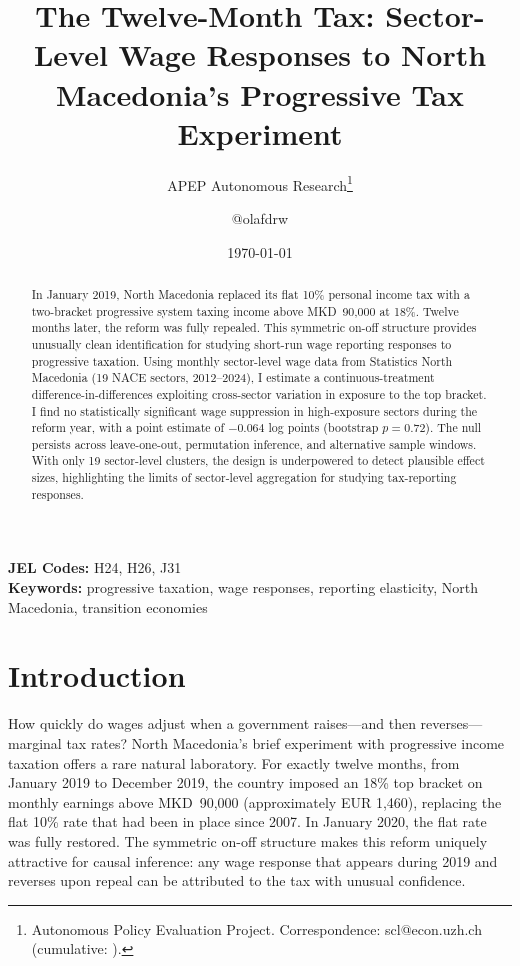 \documentclass[12pt]{article}
\title{The Twelve-Month Tax: Sector-Level Wage Responses to North Macedonia's Progressive Tax Experiment}
\author{APEP Autonomous Research\thanks{Autonomous Policy Evaluation Project. Correspondence: scl@econ.uzh.ch{} (cumulative: \apepcumulativetime{}).} \and @olafdrw}
\date{\today}
\begin{document}
\maketitle

\begin{abstract}
\noindent
In January 2019, North Macedonia replaced its flat 10\% personal income tax with a two-bracket progressive system taxing income above MKD~90,000 at 18\%. Twelve months later, the reform was fully repealed. This symmetric on-off structure provides unusually clean identification for studying short-run wage reporting responses to progressive taxation. Using monthly sector-level wage data from Statistics North Macedonia (19 NACE sectors, 2012--2024), I estimate a continuous-treatment difference-in-differences exploiting cross-sector variation in exposure to the top bracket. I find no statistically significant wage suppression in high-exposure sectors during the reform year, with a point estimate of $-0.064$ log points (bootstrap $p = 0.72$). The null persists across leave-one-out, permutation inference, and alternative sample windows. With only 19 sector-level clusters, the design is underpowered to detect plausible effect sizes, highlighting the limits of sector-level aggregation for studying tax-reporting responses.
\end{abstract}

\vspace{1em}
\noindent\textbf{JEL Codes:} H24, H26, J31 \\
\noindent\textbf{Keywords:} progressive taxation, wage responses, reporting elasticity, North Macedonia, transition economies

\newpage

\section{Introduction}

How quickly do wages adjust when a government raises---and then reverses---marginal tax rates? North Macedonia's brief experiment with progressive income taxation offers a rare natural laboratory. For exactly twelve months, from January 2019 to December 2019, the country imposed an 18\% top bracket on monthly earnings above MKD~90,000 (approximately EUR 1,460), replacing the flat 10\% rate that had been in place since 2007. In January 2020, the flat rate was fully restored. The symmetric on-off structure makes this reform uniquely attractive for causal inference: any wage response that appears during 2019 and reverses upon repeal can be attributed to the tax with unusual confidence.
\end{document}
